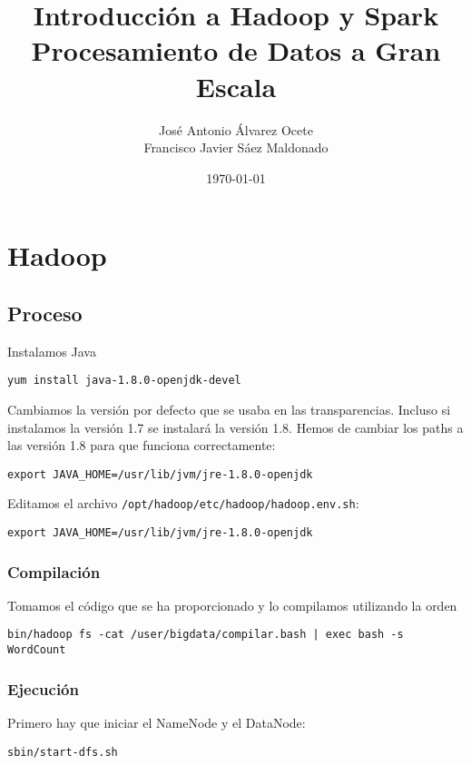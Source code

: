 \documentclass[11pt]{article}
\author{José Antonio Álvarez Ocete\\ Francisco Javier Sáez Maldonado}
\date{\today}
\title{Introducción a Hadoop y Spark\\\medskip
\large Procesamiento de Datos a Gran Escala}
\def\inline{\lstinline[basicstyle=\ttfamily,keywordstyle={}]}
\begin{document}
\maketitle

\tableofcontents

\section{Hadoop}

\subsection{Proceso}

Instalamos Java

\begin{verbatim}
yum install java-1.8.0-openjdk-devel
\end{verbatim}

Cambiamos la versión por defecto que se usaba en las transparencias. Incluso si instalamos la versión 1.7 se instalará la versión 1.8. Hemos de cambiar los paths a las versión 1.8 para que funciona correctamente:
\begin{verbatim}
export JAVA_HOME=/usr/lib/jvm/jre-1.8.0-openjdk
\end{verbatim}

Editamos el archivo  \inline{/opt/hadoop/etc/hadoop/hadoop.env.sh}:
\begin{verbatim}
export JAVA_HOME=/usr/lib/jvm/jre-1.8.0-openjdk
\end{verbatim}


\subsubsection*{ Compilación}

Tomamos el código que se ha proporcionado y lo compilamos utilizando la orden

\begin{verbatim}
bin/hadoop fs -cat /user/bigdata/compilar.bash | exec bash -s WordCount
\end{verbatim}

\subsubsection*{ Ejecución }

Primero hay que iniciar el NameNode y el DataNode:
\begin{verbatim}
sbin/start-dfs.sh
\end{verbatim}
\end{document}
